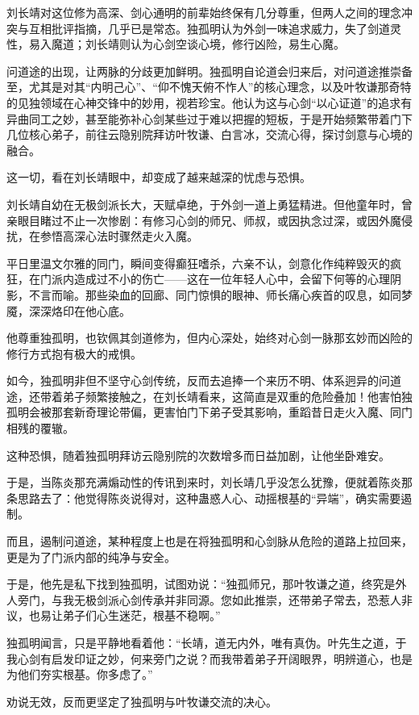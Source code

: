 刘长靖对这位修为高深、剑心通明的前辈始终保有几分尊重，但两人之间的理念冲突与互相批评指摘，几乎已是常态。独孤明认为外剑一味追求威力，失了剑道灵性，易入魔道；刘长靖则认为心剑空谈心境，修行凶险，易生心魔。

问道途的出现，让两脉的分歧更加鲜明。独孤明自论道会归来后，对问道途推崇备至，尤其是对其“内明己心”、“仰不愧天俯不怍人”的核心理念，以及叶牧谦那奇特的见独领域在心神交锋中的妙用，视若珍宝。他认为这与心剑“以心证道”的追求有异曲同工之妙，甚至能弥补心剑某些过于难以把握的短板，于是开始频繁带着门下几位核心弟子，前往云隐别院拜访叶牧谦、白言冰，交流心得，探讨剑意与心境的融合。

这一切，看在刘长靖眼中，却变成了越来越深的忧虑与恐惧。

刘长靖自幼在无极剑派长大，天赋卓绝，于外剑一道上勇猛精进。但他童年时，曾亲眼目睹过不止一次惨剧：有修习心剑的师兄、师叔，或因执念过深，或因外魔侵扰，在参悟高深心法时骤然走火入魔。

平日里温文尔雅的同门，瞬间变得癫狂嗜杀，六亲不认，剑意化作纯粹毁灭的疯狂，在门派内造成过不小的伤亡——这在一位年轻人心中，会留下何等的心理阴影，不言而喻。那些染血的回廊、同门惊惧的眼神、师长痛心疾首的叹息，如同梦魇，深深烙印在他心底。

他尊重独孤明，也钦佩其剑道修为，但内心深处，始终对心剑一脉那玄妙而凶险的修行方式抱有极大的戒惧。

如今，独孤明非但不坚守心剑传统，反而去追捧一个来历不明、体系迥异的问道途，还带着弟子频繁接触之，在刘长靖看来，这简直是双重的危险叠加！他害怕独孤明会被那套新奇理论带偏，更害怕门下弟子受其影响，重蹈昔日走火入魔、同门相残的覆辙。

这种恐惧，随着独孤明拜访云隐别院的次数增多而日益加剧，让他坐卧难安。

于是，当陈炎那充满煽动性的传讯到来时，刘长靖几乎没怎么犹豫，便就着陈炎那条思路去了：他觉得陈炎说得对，这种蛊惑人心、动摇根基的“异端”，确实需要遏制。

而且，遏制问道途，某种程度上也是在将独孤明和心剑脉从危险的道路上拉回来，更是为了门派内部的纯净与安全。

于是，他先是私下找到独孤明，试图劝说：“独孤师兄，那叶牧谦之道，终究是外人旁门，与我无极剑派心剑传承并非同源。您如此推崇，还带弟子常去，恐惹人非议，也易让弟子们心生迷茫，根基不稳啊。”

独孤明闻言，只是平静地看着他：“长靖，道无内外，唯有真伪。叶先生之道，于我心剑有启发印证之妙，何来旁门之说？而我带着弟子开阔眼界，明辨道心，也是为他们夯实根基。你多虑了。”

劝说无效，反而更坚定了独孤明与叶牧谦交流的决心。

